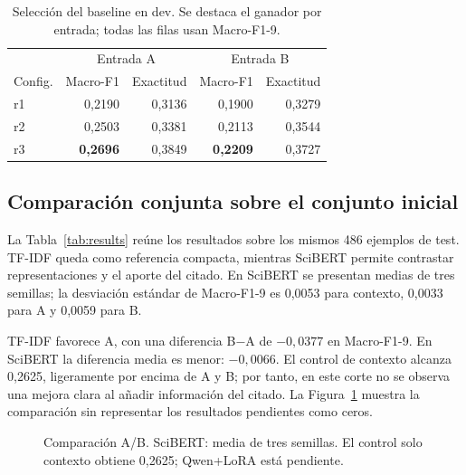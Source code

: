 \documentclass[10pt,a4paper,twocolumn]{article}
\begin{document}
\begin{table}[t]
\centering\small
\caption{Selección del baseline en dev. Se destaca el ganador por entrada; todas las filas usan Macro-F1-9.}\label{tab:tfdev}
\begin{tabular}{lrrrr}\toprule
 & \multicolumn{2}{c}{Entrada A} & \multicolumn{2}{c}{Entrada B}\\
Config. & Macro-F1 & Exactitud & Macro-F1 & Exactitud\\\midrule
r1 & 0,2190 & 0,3136 & 0,1900 & 0,3279\\
r2 & 0,2503 & 0,3381 & 0,2113 & 0,3544\\
r3 & \textbf{0,2696} & 0,3849 & \textbf{0,2209} & 0,3727\\\bottomrule
\end{tabular}
\end{table}


\subsection{Comparación conjunta sobre el conjunto inicial}
La Tabla~\ref{tab:results} reúne los resultados sobre los mismos 486 ejemplos de test. TF-IDF queda como referencia compacta, mientras SciBERT permite contrastar representaciones y el aporte del citado. En SciBERT se presentan medias de tres semillas; la desviación estándar de Macro-F1-9 es 0,0053 para contexto, 0,0033 para A y 0,0059 para B.



TF-IDF favorece A, con una diferencia B$-$A de $-0{,}0377$ en Macro-F1-9. En SciBERT la diferencia media es menor: $-0{,}0066$. El control de contexto alcanza 0,2625, ligeramente por encima de A y B; por tanto, en este corte no se observa una mejora clara al añadir información del citado. La Figura~\ref{fig:bars} muestra la comparación sin representar los resultados pendientes como ceros.

\begin{figure}[t]
\centering
{}
\caption{Comparación A/B. SciBERT: media de tres semillas. El control solo contexto obtiene 0,2625; Qwen+LoRA está pendiente.}\label{fig:bars}
\end{figure}
\end{document}
